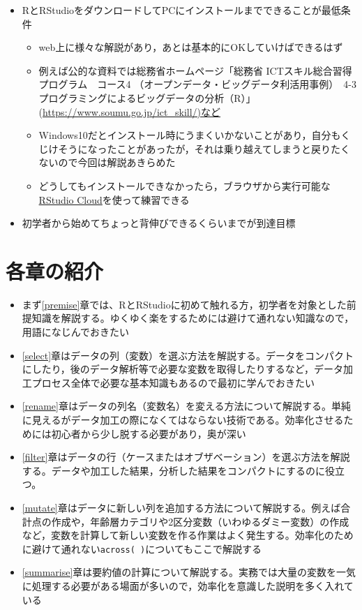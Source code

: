 \documentclass[
  xelatex,ja=standard, b5paper]{bxjsbook}
\providecommand{\tightlist}{%
  \setlength{\itemsep}{0pt}\setlength{\parskip}{0pt}}
\begin{document}
\begin{itemize}
\tightlist
\item
  RとRStudioをダウンロードしてPCにインストールまでできることが最低条件

  \begin{itemize}
  \tightlist
  \item
    web上に様々な解説があり，あとは基本的にOKしていけばできるはず
  \item
    例えば公的な資料では総務省ホームページ「総務省 ICTスキル総合習得プログラム　コース4
    （オープンデータ・ビッグデータ利活用事例）　4-3 プログラミングによるビッグデータの分析（R）」(\url{https://www.soumu.go.jp/ict_skill/)など}
  \item
    Windows10だとインストール時にうまくいかないことがあり，自分もくじけそうになったことがあったが，それは乗り越えてしまうと戻りたくないので今回は解説あきらめた
  \item
    どうしてもインストールできなかったら，ブラウザから実行可能な\href{https://rstudio.cloud/}{RStudio Cloud}を使って練習できる
  \end{itemize}
\item
  初学者から始めてちょっと背伸びできるくらいまでが到達目標
\end{itemize}

\hypertarget{ux5404ux7ae0ux306eux7d39ux4ecb}{%
\section*{各章の紹介}\label{ux5404ux7ae0ux306eux7d39ux4ecb}}

\begin{itemize}
\item
  まず\ref{premise}章では、RとRStudioに初めて触れる方，初学者を対象とした前提知識を解説する。ゆくゆく楽をするためには避けて通れない知識なので，用語になじんでおきたい
\item
  \ref{select}章はデータの列（変数）を選ぶ方法を解説する。データをコンパクトにしたり，後のデータ解析等で必要な変数を取得したりするなど，データ加工プロセス全体で必要な基本知識もあるので最初に学んでおきたい
\item
  \ref{rename}章はデータの列名（変数名）を変える方法について解説する。単純に見えるがデータ加工の際になくてはならない技術である。効率化させるためには初心者から少し脱する必要があり，奥が深い
\item
  \ref{filter}章はデータの行（ケースまたはオブザベーション）を選ぶ方法を解説する。データや加工した結果，分析した結果をコンパクトにするのに役立つ。
\item
  \ref{mutate}章はデータに新しい列を追加する方法について解説する。例えば合計点の作成や，年齢層カテゴリや2区分変数（いわゆるダミー変数）の作成など，変数を計算して新しい変数を作る作業はよく発生する。効率化のために避けて通れない\texttt{across(\ )}についてもここで解説する
\item
  \ref{summarise}章は要約値の計算について解説する。実務では大量の変数を一気に処理する必要がある場面が多いので，効率化を意識した説明を多く入れている
\end{itemize}
\end{document}
